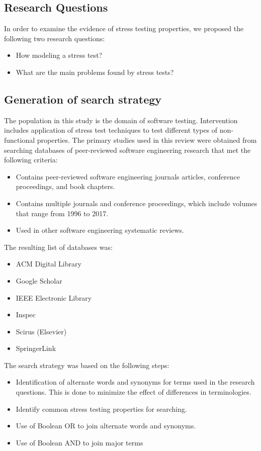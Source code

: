 \documentclass{report}
\begin{document}
\subsection{Research Questions}

In order to examine the evidence of stress testing properties, we proposed the following two research questions:


\begin{itemize}
\item How modeling a stress test?
\item What are the main problems found by stress tests?
\end{itemize}


\subsection{Generation of search strategy}


The population in this study is the domain of software testing. Intervention includes application of stress test techniques to test different types of non-functional properties. The primary studies used in this review were obtained from
searching databases of peer-reviewed software engineering research that met the following criteria:
\begin{itemize}
\item  Contains peer-reviewed software engineering journals articles, conference proceedings, and book chapters.
\item   Contains multiple journals and conference proceedings,
which include volumes that range from 1996 to 2017.
\item  Used in other software engineering systematic reviews.
\end{itemize}

The resulting list of databases was:

\begin{itemize}
\item  ACM Digital Library
\item  Google Scholar
\item  IEEE Electronic Library
\item  Inspec
\item  Scirus (Elsevier)
\item SpringerLink
\end{itemize}


The search strategy was based on the following steps:

\begin{itemize}
\item  Identification of alternate words and synonyms for terms used
in the research questions. This is done to minimize the effect
of differences in terminologies.
\item  Identify common stress testing properties for searching.
\item Use of Boolean OR to join alternate words and synonyms.
\item Use of Boolean AND to join major terms
\end{itemize}
\end{document}

